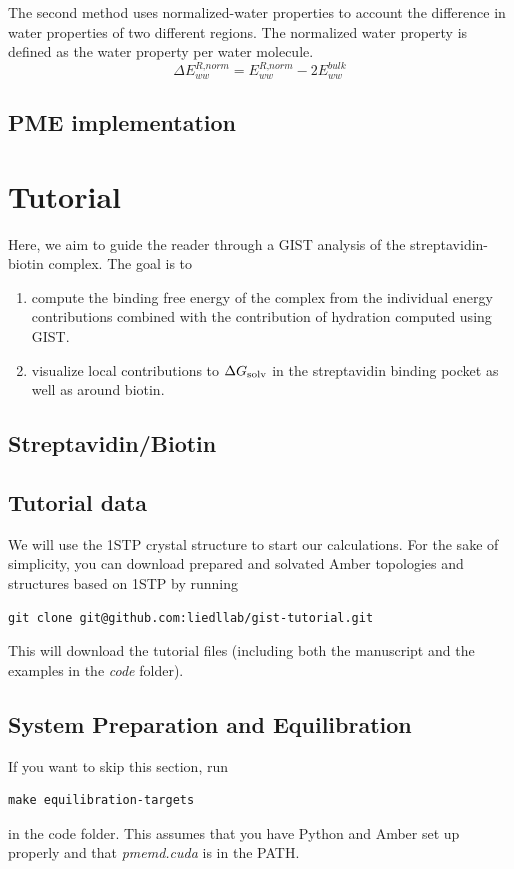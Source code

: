 \documentclass[9pt,tutorial]{livecoms}
\newcommand{\dgsolv}{\Delta G_\textup{solv}}
\newcommand{\software}{\emph}
\begin{document}
The second method uses normalized-water properties to account the difference in water properties of two different regions. The normalized water property is defined as the water property per water molecule. 
\begin{equation}
	\Delta E^\textit{R,norm}_\textit{ww} = E^\textit{R,norm}_\textit{ww} - 2E^\textit{bulk}_\textit{ww}
\end{equation}

\subsection{PME implementation}

\section{Tutorial}
Here, we aim to guide the reader through a GIST analysis of the streptavidin-biotin complex. The goal is to
\begin{enumerate}
	\item compute the binding free energy of the complex from the individual energy contributions combined with the contribution of hydration computed using GIST.
	\item visualize local contributions to $\dgsolv$ in the streptavidin binding pocket as well as around biotin.
\end{enumerate}

\subsection{Streptavidin/Biotin}
\subsection{Tutorial data}
We will use the 1STP crystal structure to start our calculations.
For the sake of simplicity, you can download prepared and solvated Amber topologies and structures based on 1STP by running
\begin{lstlisting}
git clone git@github.com:liedllab/gist-tutorial.git
\end{lstlisting}
This will download the tutorial files (including both the manuscript and the examples in the \software{code} folder).
\subsection{System Preparation and Equilibration}
If you want to skip this section, run 
\begin{lstlisting}
make equilibration-targets
\end{lstlisting}
in the code folder. This assumes that you have Python and Amber set up properly and that \software{pmemd.cuda} is in the PATH.
\end{document}
